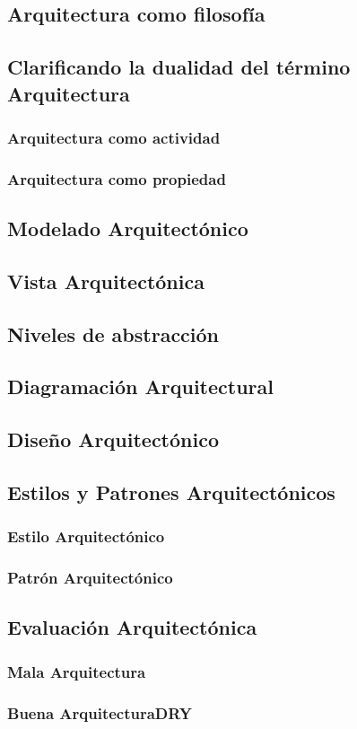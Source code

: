 \subsection{Arquitectura como filosofía}
\subsection{Clarificando la dualidad del término Arquitectura}
\subsubsection{Arquitectura como actividad}
\subsubsection{Arquitectura como propiedad}
\subsection{Modelado Arquitectónico}
\subsection{Vista Arquitectónica}
\subsection{Niveles de abstracción}
\subsection{Diagramación Arquitectural}
\subsection{Diseño Arquitectónico}
\subsection{Estilos y Patrones Arquitectónicos}
\subsubsection{Estilo Arquitectónico}
\subsubsection{Patrón Arquitectónico}
\subsection{Evaluación Arquitectónica}
\subsubsection{Mala Arquitectura}
\subsubsection{Buena ArquitecturaDRY}

